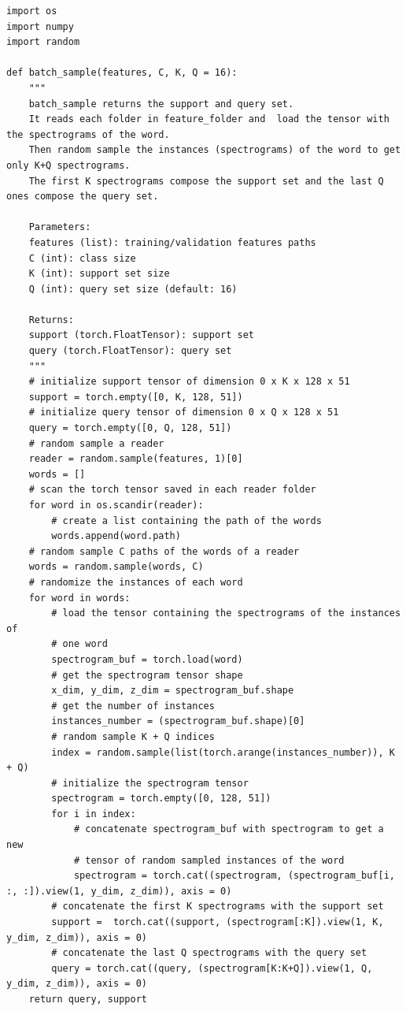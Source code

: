 \documentclass[12pt,a4paper,titlepage]{article}
\begin{document}
\begin{lstlisting}[language=iPython,firstnumber=1, caption=batch\_sample, label=batch_sample,captionpos=b]
import os
import numpy
import random

def batch_sample(features, C, K, Q = 16):
    """
    batch_sample returns the support and query set. 
    It reads each folder in feature_folder and  load the tensor with the spectrograms of the word.
    Then random sample the instances (spectrograms) of the word to get only K+Q spectrograms. 
    The first K spectrograms compose the support set and the last Q ones compose the query set.

    Parameters:
    features (list): training/validation features paths
    C (int): class size
    K (int): support set size
    Q (int): query set size (default: 16)

    Returns:
    support (torch.FloatTensor): support set
    query (torch.FloatTensor): query set
    """
    # initialize support tensor of dimension 0 x K x 128 x 51
    support = torch.empty([0, K, 128, 51])
    # initialize query tensor of dimension 0 x Q x 128 x 51
    query = torch.empty([0, Q, 128, 51])
    # random sample a reader
    reader = random.sample(features, 1)[0]
    words = []
    # scan the torch tensor saved in each reader folder
    for word in os.scandir(reader):
        # create a list containing the path of the words
        words.append(word.path)
    # random sample C paths of the words of a reader
    words = random.sample(words, C)
    # randomize the instances of each word
    for word in words:
        # load the tensor containing the spectrograms of the instances of
        # one word
        spectrogram_buf = torch.load(word)
        # get the spectrogram tensor shape
        x_dim, y_dim, z_dim = spectrogram_buf.shape
        # get the number of instances
        instances_number = (spectrogram_buf.shape)[0]
        # random sample K + Q indices
        index = random.sample(list(torch.arange(instances_number)), K + Q)
        # initialize the spectrogram tensor
        spectrogram = torch.empty([0, 128, 51])
        for i in index:
            # concatenate spectrogram_buf with spectrogram to get a new
            # tensor of random sampled instances of the word
            spectrogram = torch.cat((spectrogram, (spectrogram_buf[i, :, :]).view(1, y_dim, z_dim)), axis = 0)
        # concatenate the first K spectrograms with the support set
        support =  torch.cat((support, (spectrogram[:K]).view(1, K, y_dim, z_dim)), axis = 0)
        # concatenate the last Q spectrograms with the query set
        query = torch.cat((query, (spectrogram[K:K+Q]).view(1, Q, y_dim, z_dim)), axis = 0)
    return query, support
\end{lstlisting}
\end{document}

